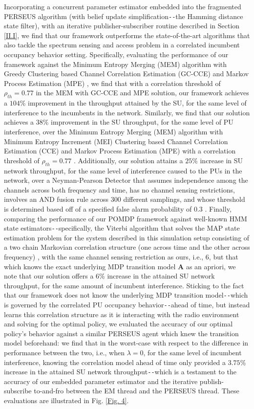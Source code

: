 \documentclass[12pt, draftcls, onecolumn]{IEEEtran}
\begin{document}
Incorporating a concurrent parameter estimator embedded into the fragmented PERSEUS algorithm (with belief update simplification\texttt{-{}-}the Hamming distance state filter), with an iterative publisher-subscriber routine described in Section \ref{II.I}, we find that our framework outperforms the state-of-the-art algorithms that also tackle the spectrum sensing and access problem in a correlated incumbent occupancy behavior setting. Specifically, evaluating the performance of our framework against the Minimum Entropy Merging (MEM) algorithm with Greedy Clustering based Channel Correlation Estimation (GC-CCE) and Markov Process Estimation (MPE) \cite{WCL:7}, we find that with a correlation threshold of $\rho_{th}{=}0.77$ in the MEM with GC-CCE and MPE solution, our framework achieves a $104$\% improvement in the throughput attained by the SU, for the same level of interference to the incumbents in the network. Similarly, we find that our solution achieves a $38$\% improvement in the SU throughput, for the same level of PU interference, over the Minimum Entropy Merging (MEM) algorithm with Minimum Entropy Increment (MEI) Clustering based Channel Correlation Estimation (CCE) and Markov Process Estimation (MPE) with a correlation threshold of $\rho_{th}{=}0.77$ \cite{WCL:7}. Additionally, our solution attains a $25$\% increase in SU network throughput, for the same level of interference caused to the PUs in the network, over a Neyman-Pearson Detector that assumes independence among the channels across both frequency and time, has no channel sensing restrictions, involves an AND fusion rule across 300 different samplings, and whose threshold is determined based off of a specified false alarm probability of $0.3$ \cite{WCL:paper, WCL:11}. Finally, comparing the performance of our POMDP framework against well-known HMM state estimators\texttt{-{}-}specifically, the Viterbi algorithm that solves the MAP state estimation problem for the system described in this simulation setup consisting of a two chain Markovian correlation structure (one across time and the other across frequency) \cite{WCL:6}, with the same channel sensing restriction as ours, i.e., $6$, but that which knows the exact underlying MDP transition model $\mathbf{A}$ as an apriori, we note that our solution offers a $6$\% increase in the attained SU network throughput, for the same amount of incumbent interference. Sticking to the fact that our framework does not know the underlying MDP transition model\texttt{-{}-}which is governed by the correlated PU occupancy behavior\texttt{-{}-}ahead of time, but instead learns this correlation structure as it is interacting with the radio environment and solving for the optimal policy, we evaluated the accuracy of our optimal policy's behavior against a similar PERSEUS agent which knew the transition model beforehand: we find that in the worst-case with respect to the difference in performance between the two, i.e., when $\lambda{=}0$, for the same level of incumbent interference, knowing the correlation model ahead of time only provided a $3.75$\% increase in the attained SU network throughput\texttt{-{}-}which is a testament to the accuracy of our embedded parameter estimator and the iterative publish-subscribe to-and-fro between the EM thread and the PERSEUS thread. These evaluations are illustrated in Fig. \ref{Fig. 4}.
\end{document}
